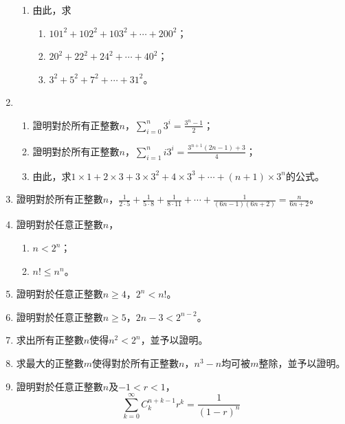 \documentclass[12pt]{article}
\begin{document}
\begin{enumerate}
\begin{enumerate}
            \item 由此，求\begin{enumerate}
                \item $101^2+102^2+103^2+\cdots+200^2$；
                \item $20^2+22^2+24^2+\cdots+40^2$；
                \item $3^2+5^2+7^2+\cdots+31^2$。
            \end{enumerate}
        \end{enumerate}
        \item \begin{enumerate}
            \item 證明對於所有正整數$n$，$\displaystyle \sum_{i=0}^{n}3^i=\frac{3^n-1}{2}$；
            \item 證明對於所有正整數$n$，$\displaystyle \sum_{i=1}^{n}i3^i=\frac{3^{n+1}(2n-1)+3}{4}$；
            \item 由此，求$1\times 1+2\times 3+3\times 3^2+4\times 3^3+\cdots +(n+1)\times 3^n$的公式。
        \end{enumerate}
        \item 證明對於所有正整數$n$，$\displaystyle \frac{1}{2\cdot 5}+\frac{1}{5\cdot 8}+\frac{1}{8\cdot 11}+\cdots+\frac{1}{(6n-1)(6n+2)}=\frac{n}{6n+2}$。
        \item 證明對於任意正整數$n$，\begin{enumerate}
            \item $n<2^n$；
            \item $n!\leq n^n$。
        \end{enumerate}
        \item 證明對於任意正整數$n\geq 4$，$2^n<n!$。
        \item 證明對於任意正整數$n\geq 5$，$2n-3<2^{n-2}$。
        \item 求出所有正整數$n$使得$n^2<2^n$，並予以證明。
        \item 求最大的正整數$m$使得對於所有正整數$n$，$n^3-n$均可被$m$整除，並予以證明。
        \item 證明對於任意正整數$n$及$-1<r<1$，$$\sum_{k=0}^\infty C_k^{n+k-1}r^k=\frac{1}{(1-r)^n}$$
    \end{enumerate}
    
\end{document}
